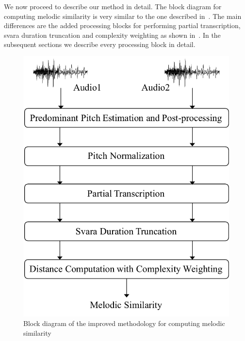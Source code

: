 We now proceed to describe our method in detail. The block diagram for computing melodic similarity is very similar to the one described in~. The main differences are the added processing blocks for performing partial transcription, \gls{svara} duration truncation and complexity weighting as shown in~. In the subsequent sections we describe every processing block in detail. 

\begin{figure}
	\begin{center}
		\includegraphics[width=\figSizeSixty]{ch06_patterns/figures/ImprovingSimilarity/melodic_similarity_improve_blockd.pdf}
	\end{center}
	\caption[Block diagram for an improved melodic similarity computation]{Block diagram of the improved methodology for computing melodic similarity} 
	\label{fig:block_diagram_melodic_similarity_improved}
\end{figure}

